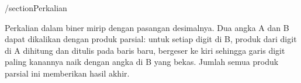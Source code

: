 /section{Perkalian}

Perkalian dalam biner mirip dengan pasangan desimalnya. Dua angka A dan B dapat dikalikan dengan produk parsial: untuk setiap digit di B, produk dari digit di A dihitung dan ditulis pada baris baru, bergeser ke kiri sehingga garis digit paling kanannya naik dengan angka di B yang bekas. Jumlah semua produk parsial ini memberikan hasil akhir.